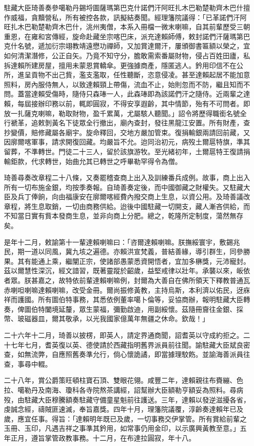 \begin{pinyinscope}
駐藏大臣琦善奏參噶勒丹錫埒圖薩瑪第巴克什諾們汗阿旺扎木巴勒楚勒齊木巴什擅作威福，貪黷營私，所有被控各款，訊擬結奏聞。經理籓院議得：「已革諾們汗阿旺扎木巴勒楚勒齊木巴什，洮州夷僧，本系入冊檔一微末喇嘛，自其前輩歷受三朝重恩，在雍和宮傳經，旋命赴藏坐宗喀巴床，派充達賴師傅，敕封諾們汗薩瑪第巴克什名號，遞加衍宗翊教靖遠懋功禪師，又加賞達爾汗，屢頒御書匾額以榮之，宜如何清潔潛修，公正自矢。乃竟不知守分，膽敢需索番屬財物，侵占百姓田廬，私拆達賴所建房屋，擅用未蒙恩賞轎傘。更強據商產，隱匿逃人。鈐用印信不在公所，進呈貢物不出己貲，濫支濫取，任性聽斷，恣意侵凌。甚至達賴起居不能加意照料，房內服侍無人，以致達賴頸上帶傷，流血不止，始則忽而不防，繼且知而不問。蓋當達賴受傷時，隨侍只森琫一人，此森琫即為該諾們汗之隨侍。近兩輩之達賴，每屆接辦印務以前，輒即圓寂，不得安享遐齡，其中情節，殆有不可問者。即放一扎薩克喇嘛，勒取財物，盈千累萬，尤屬駭人聽聞。」詔令將歷得職銜名號全行褫革，追敕剝黃名下徒眾全行撤出，廟內查封，發往黑龍江安置。所有財產，查抄變價，賠修藏屬各廟宇。旋命釋回，交地方嚴加管束。復捐輸銀兩請回前藏，又因廓爾喀軍事，請求開復回藏。均嚴旨不允。迨同治初元，病歿土爾扈特旗，準其留葬，不準轉世。門徒二十三人，留於該旗游牧。至光緒初年，土爾扈特王復請捐輸鉅款，代求轉世，始曲允其已轉世之呼畢勒罕得令為僧。

琦善尋奏改章程二十八條，又奏罷稽查商上出入及訓練番兵成例。故事，商上出入所有一切布施金銀，均按季奏報。自琦善奏定後，而中國御藏之財權失。又駐藏大臣及兵丁俸餉，向由福康安在廓爾喀經費內撥交商上生息，以資公用。及琦善議改章程，將生息取銷，一切由商務供給。迨後中國駐藏一切開支，藏人漸吝供給，而不知當日實有貲本發商生息，並非向商上分肥。總之，乾隆所定制度，蕩然無存矣。

是年十二月，敕諭第十一輩達賴喇嘛曰：「咨爾達賴喇嘛。朕撫綏寰宇，敷錫兆民，期一道以同風，冀九垓之遍德。亦賴洪宣梵義，普結善緣，導引群生，同參勝果。其有能通上乘，繼闡正宗，使諸部愚蒙悉資開悟者，宜加多楙獎，元沛寵封。茲以爾慧性深沉，經文諳習，既著靈蹤於齠歲，益堅戒律以壯年。承襲以來，皈依者眾。朕甚嘉之，故特依前輩達賴喇嘛例，封爾為大善自在佛所領天下釋教普通瓦赤喇呾喇嘛達賴喇嘛，改受金冊。爾尚振修黃教，主持烏斯，本利濟以佑民，迓庥祥而護國。所有圖伯特事務，其悉依例董率噶卜倫等，妥協商辦，報明駐藏大臣轉奏，俾圖伯特闔境延釐，眾生蒙福，彌勤啟迪，用副綏懷。茲隨冊齎往金銀、採幣、玻磁器皿，爾其敬承，以光我國家億萬年無疆之休命。欽哉！」

二十六年十二月，琦善以披楞，即英人，請定界通商聞，詔耆英以守成約拒之。二十七年七月，耆英復以英、德使請於西藏指明舊界派員前往聞。諭駐藏大臣斌良密查，如無流弊，自應照舊奏準允行，倘心懷詭譎，即當據理駮飭。並諭海善派員往查，事尋中輟。

二十八年，賞公爵策旺頓柱寶石頂、雙眼花翎。咸豐二年，達賴親往布賚繃、色拉、噶勒丹及南海、瓊科各寺院熬茶講經，詔幫辦大臣額勒亨額妥為照料。尋病歿，由駐藏大臣穆騰額奏駐藏守備童星魁前往護送。三年，達賴以發逆滋擾各省，虔誠念經，禱賊匪速滅，奉旨嘉獎。四年十月，理籓院議覆，淳齡奏達賴年已及歲，應宜任事。得旨：「達賴明年既已及歲，一切事務交伊掌管。所有賞給前輩之玉冊、玉印，凡遇吉祥之事準其鈐用，如常事仍用金印，以示廣興黃教至意。」五年正月，遵旨掌管政教事務。十二月，在布達拉圓寂，年十八。


\end{pinyinscope}
